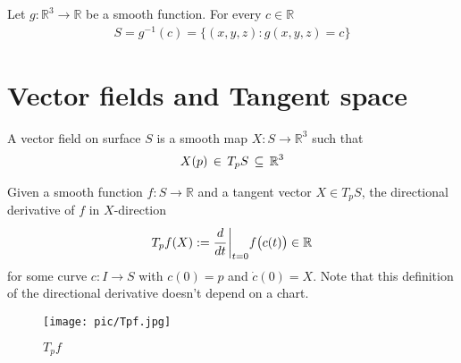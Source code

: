 \documentclass[10pt]{article}
\begin{document}
            \begin{definition}
                Let $g:\mathbb{R}^3\rightarrow\mathbb{R}$ be a smooth function. For every $c\in\mathbb{R}$
                \begin{equation*}
                    \begin{aligned}
                        S = g^{-1}(c) = \{ (x,y,z): g(x,y,z) = c \}
                    \end{aligned}
                \end{equation*}
            \end{definition}














            
	\section{Vector fields and Tangent space}\label{sec:Vector fields and Tangent space}
            \begin{definition}
			A vector field on surface $S$ is a smooth map $X: S\rightarrow\mathbb{R}^3$ such that
    		  \begin{equation*}
    		      \begin{aligned}
    		          X(p)\thinspace\in\thinspace T_pS\thinspace\subseteq\thinspace\mathbb{R}^3
    		      \end{aligned}
    		  \end{equation*}
            \end{definition}

		\begin{definition}[$T_pf$]
			Given a smooth function $f: S\rightarrow\mathbb{R}$ and a tangent vector $X\in T_pS$, the directional derivative of $f$ in $X$-direction
			\begin{equation*}
				\begin{aligned}
					T_pf(X) := \cfrac{d}{dt}\thinspace\bigg|_{t=0}f\big(c(t)\big) \in\mathbb{R}
				\end{aligned}
			\end{equation*}
			for some curve $c: I\rightarrow S$ with $c(0) =p$ and $\dot{c}(0) = X$. Note that this definition of the directional derivative doesn't depend on a chart.
		\end{definition}
		\begin{marginfigure}
                \vspace{-4.2cm}
                \begin{figure}[H]
                    \centering
                    \texttt{[image: pic/Tpf.jpg]}
                    \caption{$T_pf$}
                \end{figure}
		\end{marginfigure}
\end{document}
